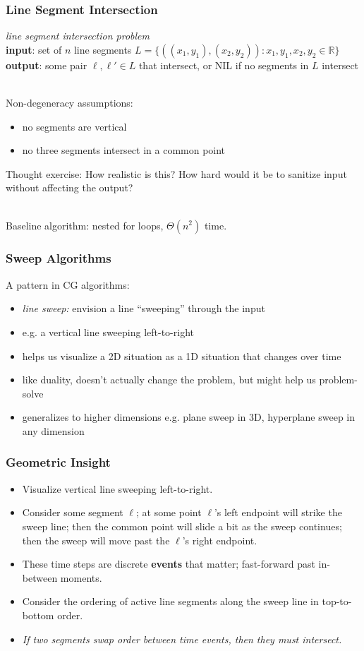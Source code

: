 \documentclass{beamer}
\newcommand{\stanza}{ \\~\ }
\begin{document}
\begin{frame} \frametitle{Line Segment Intersection}
\emph{line segment intersection problem} \\
\textbf{input}: set of $n$ line segments
  $L=\{ ((x_1, y_1), (x_2, y_2)) : x_1, y_1, x_2, y_2 \in \mathbb{R} \}$ \\
\textbf{output}: some pair $\ell, \ell' \in L$ that intersect, or NIL if
  no segments in $L$ intersect \stanza

Non-degeneracy assumptions:
\begin{itemize}
  \item no segments are vertical
  \item no three segments intersect in a common point
\end{itemize}

Thought exercise: How realistic is this? How hard would it be to sanitize input
without affecting the output? \stanza

Baseline algorithm: nested for loops, $\Theta(n^2)$ time.
\end{frame}

\begin{frame} \frametitle{Sweep Algorithms}
A pattern in CG algorithms:
\begin{itemize}
  \item \emph{line sweep:} envision a line ``sweeping'' through the input
  \item e.g. a vertical line sweeping left-to-right
  \item helps us visualize a 2D situation as a 1D situation that changes over
    time
  \item like duality, doesn't actually change the problem, but might help us
    problem-solve
  \item generalizes to higher dimensions e.g. plane sweep in 3D, hyperplane sweep
    in any dimension
\end{itemize}
\end{frame}

\begin{frame} \frametitle{Geometric Insight}
\begin{itemize}
  \item Visualize vertical line sweeping left-to-right.
  \item Consider some segment $\ell$; at some point $\ell$'s left endpoint will strike
    the sweep line; then the common point will slide a bit as the sweep continues;
    then the sweep will move past the $\ell$'s right endpoint.
  \item These time steps are discrete \textbf{events} that matter; fast-forward
    past in-between moments.
  \item Consider the ordering of active line segments along the sweep line
    in top-to-bottom order.
  \item \emph{If two segments swap order between time events, then they must intersect.}
\end{itemize}
\end{frame}
\end{document}

